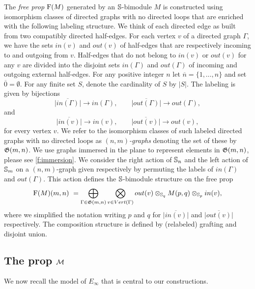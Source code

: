 The \textit{free prop} $\free(M)$ generated by an $\S$-bimodule $M$ is constructed using isomorphism classes of directed graphs with no directed loops that are enriched with the following labeling structure.
We think of each directed edge as built from two compatibly directed half-edges.
For each vertex $v$ of a directed graph $\Gamma$, we have the sets $in(v)$ and $out(v)$ of half-edges that are respectively incoming to and outgoing from $v$.
Half-edges that do not belong to $in(v)$ or $out(v)$ for any $v$ are divided into the disjoint sets $in(\Gamma)$ and $out(\Gamma)$ of incoming and outgoing external half-edges.
For any positive integer $n$ let $\overline{n} = \{1, \dots, n\}$ and set $\overline{0} = \emptyset$.
For any finite set $S$, denote the cardinality of $S$ by $|S|$.
The labeling is given by bijections
\[
\overline{|in(\Gamma)|}\to in(\Gamma), \qquad
\overline{|out(\Gamma)|}\to out(\Gamma),
\]
and
\[
\overline{|in(v)|}\to in(v), \qquad
\overline{|out(v)|}\to out(v),
\]
for every vertex $v$.
We refer to the isomorphism classes of such labeled directed graphs with no directed loops as $(n,m)$\textit{-graphs} denoting the set of these by $\graphs(m,n)$.
We use graphs immersed in the plane to represent elements in $\graphs(m,n)$, please see \cref{f:immersion}.
We consider the right action of $\S_n$ and the left action of $\S_m$ on a $(n,m)$-graph given respectively by permuting the labels of $in(\Gamma)$ and $out(\Gamma)$.
This action defines the $\S$-bimodule structure on the free prop
\begin{equation} \label{e:free prop}
\free(M)(m,n) \ = \bigoplus_{\Gamma \in \graphs(m,n)} \bigotimes_{v \in Vert(\Gamma)} out(v) \otimes_{\S_q} M(p, q) \otimes_{\S_p} in(v),
\end{equation}
where we simplified the notation writing $p$ and $q$ for $\overline{|in(v)|}$ and $\overline{|out(v)|}$ respectively.
The composition structure is defined by (relabeled) grafting and disjoint union.

\subsection{The prop $\M$}

We now recall the model of $E_\infty$ that is central to our constructions.


